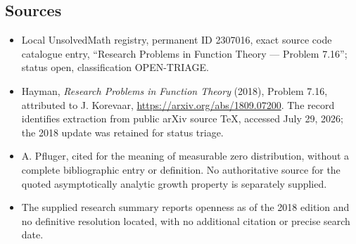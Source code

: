 \documentclass[11pt]{article}
\begin{document}
\subsection{Sources}
\begin{itemize}
\item Local UnsolvedMath registry, permanent ID 2307016, exact source code catalogue entry, ``Research Problems in Function Theory --- Problem 7.16''; status open, classification OPEN-TRIAGE.
\item Hayman, \emph{Research Problems in Function Theory} (2018), Problem 7.16, attributed to J. Korevaar, \url{https://arxiv.org/abs/1809.07200}. The record identifies extraction from public arXiv source TeX, accessed July 29, 2026; the 2018 update was retained for status triage.
\item A. Pfluger, cited for the meaning of measurable zero distribution, without a complete bibliographic entry or definition. No authoritative source for the quoted asymptotically analytic growth property is separately supplied.
\item The supplied research summary reports openness as of the 2018 edition and no definitive resolution located, with no additional citation or precise search date.
\end{itemize}
\end{document}
